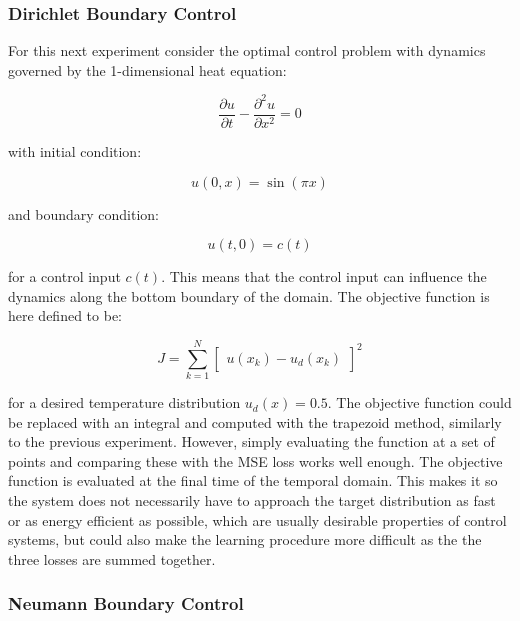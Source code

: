 \subsubsection{Dirichlet Boundary Control}

For this next experiment consider the optimal control problem with dynamics governed by the 1-dimensional heat equation:

\begin{equation}
    \frac{\partial u}{\partial t} - \frac{\partial^2 u}{\partial x^2} = 0
\end{equation}

\noindent with initial condition:

\begin{equation}
    u(0, x) = \sin (\pi x)
\end{equation}

\noindent and boundary condition:

\begin{equation}
    u(t, 0) = c(t)
\end{equation}

\noindent for a control input $c(t)$. This means that the control input can influence the dynamics along the bottom boundary of the domain. The objective function is here defined to be:

\begin{equation}
    J = \sum_{k=1}^{N} \begin{bmatrix} u(x_k) - u_d(x_k) \end{bmatrix}^2
\end{equation}

\noindent for a desired temperature distribution $u_d(x) = 0.5$. The objective function could be replaced with an integral and computed with the trapezoid method, similarly to the previous experiment. However, simply evaluating the function at a set of points and comparing these with the MSE loss works well enough. The objective function is evaluated at the final time of the temporal domain. This makes it so the system does not necessarily have to approach the target distribution as fast or as energy efficient as possible, which are usually desirable properties of control systems, but could also make the learning procedure more difficult as the the three losses are summed together.

\subsubsection{Neumann Boundary Control}

